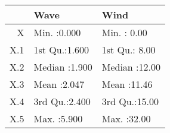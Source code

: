 \begin{tabular}{rll}
  \toprule
 &      Wave &      Wind \\ 
  \midrule
X & Min.   :0.000   & Min.   : 0.00   \\ 
  X.1 & 1st Qu.:1.600   & 1st Qu.: 8.00   \\ 
  X.2 & Median :1.900   & Median :12.00   \\ 
  X.3 & Mean   :2.047   & Mean   :11.46   \\ 
  X.4 & 3rd Qu.:2.400   & 3rd Qu.:15.00   \\ 
  X.5 & Max.   :5.900   & Max.   :32.00   \\ 
   \bottomrule
\end{tabular}
